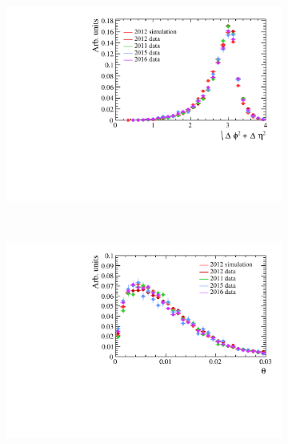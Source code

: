 \begin{figure}
    \centering
    \begin{subfigure}[b]{0.48\textwidth}
        \includegraphics[width=\textwidth]{./Figs/Selection/bkgnf_DeltaR.pdf}
    \end{subfigure}
    ~ %
    \begin{subfigure}[b]{0.48\textwidth}
       \includegraphics[width=\textwidth]{./Figs/Selection/bkgnd_DIRA.pdf}
    \end{subfigure}




\end{figure}
